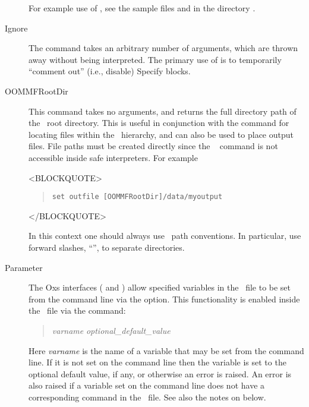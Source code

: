 \begin{description}
For example use of , see the sample files
 and  in the
directory .


\item[Ignore\label{html:mif2Ignore}]
The  command takes an arbitrary number of arguments, which
are thrown away without being interpreted.  The primary use of
 is to temporarily ``comment out'' (i.e., disable) Specify
blocks.

\item[OOMMFRootDir\label{html:mif2oommfrootdir}]
This command takes no arguments, and returns the full directory path of
the \OOMMF\ root directory.  This is useful in conjunction with the
 command for locating files within the \OOMMF\ hierarchy,
and can also be used to place output files.  File paths must be created
directly since the \Tcl\  command is not accessible inside safe
interpreters.  For example
\begin{rawhtml}
<BLOCKQUOTE>
\end{rawhtml}
\begin{quote}
\begin{verbatim}
set outfile [OOMMFRootDir]/data/myoutput
\end{verbatim}
\end{quote}
\begin{rawhtml}
</BLOCKQUOTE>
\end{rawhtml}
In this context one should always use \Tcl\ path conventions.  In
particular, use forward slashes, ``\fs'', to separate directories.

\item[Parameter\label{html:mif2parameter}]
The Oxs interfaces
( and
)
allow specified variables in the \MIF\ file to be set from the command
line via the  option.  This functionality is enabled
inside the \MIF\ file via the  command:
\begin{quote}
 \textit{varname} \textit{optional\_default\_value}
\end{quote}
Here \textit{varname} is the name of a variable that may be set from
the command line.  If it is not set on the command line then the
variable is set to the optional default value, if any, or otherwise an
error is raised.  An error is also raised if a variable set on the
command line does not have a corresponding  command in the
\MIF\ file.  See also the notes on
 below.


\end{description}
